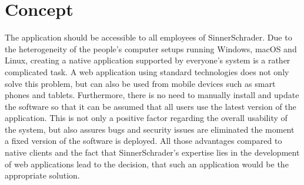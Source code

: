 \chapter{Concept}
The application should be accessible to all employees of SinnerSchrader. Due to the heterogeneity of the people’s computer setups running Windows, macOS and Linux, creating a native application supported by everyone’s system is a rather complicated task. A web application using standard technologies does not only solve this problem, but can also be used from mobile devices such as smart phones and tablets. Furthermore, there is no need to manually install and update the software so that it can be assumed that all users use the latest version of the application. This is not only a positive factor regarding the overall usability of the system, but also assures bugs and security issues are eliminated the moment a fixed version of the software is deployed. All those advantages compared to native clients and the fact that SinnerSchrader’s expertise lies in the development of web applications lead to the decision, that such an application would be the appropriate solution.



